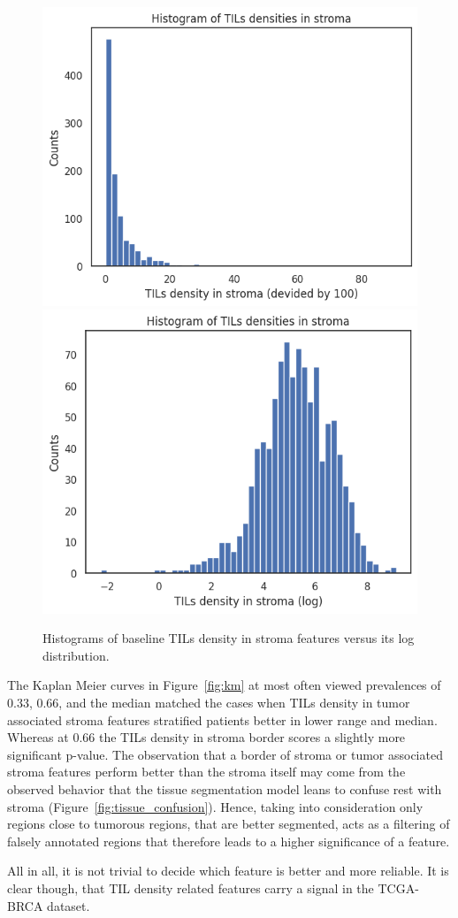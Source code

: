 \begin{figure}[H]
\centering
\includegraphics[width=0.4\linewidth]{figures/survival/histo_tils.png}
\includegraphics[width=0.4\linewidth]{figures/survival/histo_tils_log.png}
\caption{Histograms of baseline TILs density in stroma features versus its log distribution.}
\label{fig:histo_tils}
\end{figure}
    

The Kaplan Meier curves in Figure~\ref{fig:km} at most often viewed prevalences of
0.33, 0.66, and the median matched the cases when TILs density in tumor associated
stroma features stratified patients better in lower range and median.
Whereas at 0.66 the TILs density in stroma border scores a slightly more significant p-value.
The observation that a border of stroma or tumor associated stroma features perform better
than the stroma itself may come from the observed behavior that the tissue segmentation model
leans to confuse rest with stroma (Figure~\ref{fig:tissue_confusion}).
Hence, taking into consideration only regions close to tumorous regions, that are better
segmented, acts as a filtering of falsely annotated regions that therefore leads to a higher
significance of a feature.


All in all, it is not trivial to decide which feature is better and more reliable.
It is clear though, that TIL density related features carry a signal in the TCGA-BRCA dataset.

